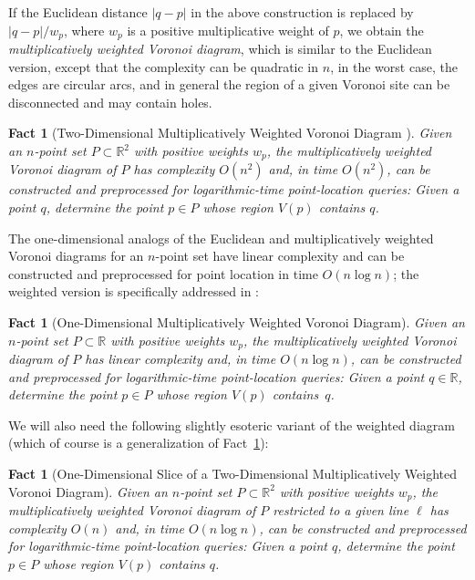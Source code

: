 \documentclass[11pt]{article}
\newtheorem{fact}[theorem]{Fact}
\theoremstyle{remark}
\def\RR{\mathbb{R}}
\begin{document}
If the Euclidean distance $|q-p|$ in the above construction is replaced
by $|q-p|/w_p$, where $w_p$ is a positive multiplicative
weight of $p$, we obtain the \emph{multiplicatively weighted Voronoi diagram},
which is similar to the Euclidean version, except that the complexity
can be quadratic in $n$, in the worst case, the edges are circular
arcs, and in general the region of a given Voronoi site can be
disconnected and may contain holes.



\begin{fact}[Two-Dimensional Multiplicatively Weighted Voronoi Diagram \cite{ae-oacwvdp-84}]
  \label{fact:vor-2d-wtd}
  Given an $n$-point set $P \subset \RR^2$ with positive weights
  $w_p$, the multiplicatively weighted Voronoi diagram of $P$ has
  complexity $O(n^2)$ and, in time $O(n^2)$,  can be constructed and
  preprocessed for logarithmic-time \emph{point-location queries}:
  Given a point $q$, determine the point $p \in P$ whose region $V(p)$
  contains $q$.
\end{fact}

The one-dimensional analogs of the Euclidean and multiplicatively
weighted Voronoi diagrams for an $n$-point set have linear complexity
and can be constructed and preprocessed for point location in time
$O(n \log n)$; the weighted version is specifically addressed
in \cite{a-odwvd-86}:

\begin{fact}[One-Dimensional Multiplicatively Weighted Voronoi Diagram]
  \label{fact:vor-1d-wtd}
  Given an $n$-point set $P \subset \RR$ with positive weights
  $w_p$, the multiplicatively weighted Voronoi diagram of $P$ has
  linear complexity and, in time $O(n \log n)$, can be constructed and
  preprocessed for logarithmic-time \emph{point-location queries}:
  Given a point $q \in \RR$, determine the point $p \in P$ whose region $V(p)$
  contains~$q$.
\end{fact}

We will also need the following slightly esoteric variant of the weighted diagram (which of course is a generalization of Fact~\ref{fact:vor-1d-wtd}): 

\begin{fact}[One-Dimensional Slice of a Two-Dimensional Multiplicatively Weighted Voronoi Diagram]
  \label{fact:vor-2d-slice}
  Given an $n$-point set $P \subset \RR^2$ with positive weights $w_p$,
  the multiplicatively weighted Voronoi diagram of $P$ restricted to a
  given line $\ell$ has complexity $O(n)$ and, in time
  $O(n \log n)$, can be constructed and preprocessed for logarithmic-time
  \emph{point-location queries}: Given a point $q$, determine the
  point $p \in P$ whose region $V(p)$ contains $q$.
\end{fact}
\end{document}
